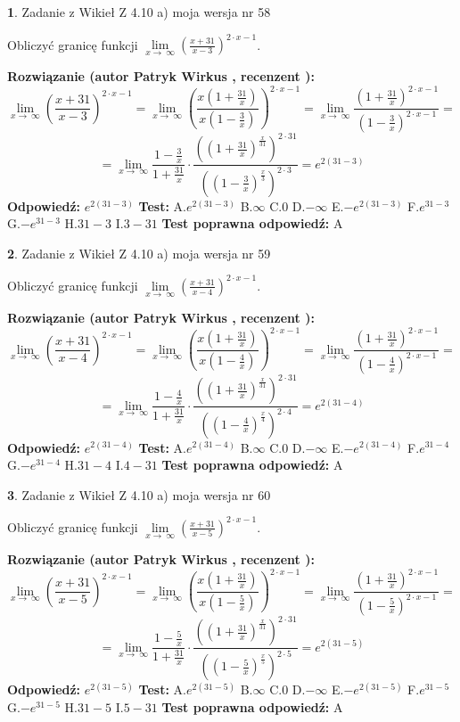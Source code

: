 \documentclass[12pt, a4paper]{article}
\theoremstyle{definition} %
\newtheorem{zad}{}
\newcommand{\zadStart}[1]{\begin{zad}#1\newline}
\newcommand{\zadStop}{\end{zad}}
\newcommand{\rozwStart}[2]{\noindent \textbf{Rozwiązanie (autor #1 , recenzent #2): }\newline}
\newcommand{\rozwStop}{\newline}
\newcommand{\odpStart}{\noindent \textbf{Odpowiedź:}\newline}
\newcommand{\odpStop}{\newline}
\newcommand{\testStart}{\noindent \textbf{Test:}\newline}
\newcommand{\testStop}{\newline}
\newcommand{\kluczStart}{\noindent \textbf{Test poprawna odpowiedź:}\newline}
\newcommand{\kluczStop}{\newline}
\begin{document}
\zadStart{Zadanie z Wikieł Z 4.10 a) moja wersja nr 58}


Obliczyć granicę funkcji  $\lim\limits_{x\to\ \infty}(\frac{x+31}{x-3})^{2\cdot x-1}$.
\zadStop
\rozwStart{Patryk Wirkus}{}
$$\lim\limits_{x\to\ \infty}(\frac{x+31}{x-3})^{2\cdot x-1} = \lim\limits_{x\to\ \infty}(\frac{x(1+\frac{31}{x})}{x(1-\frac{3}{x})})^{2\cdot x-1}=\lim\limits_{x\to\ \infty}\frac{(1+\frac{31}{x})^{2\cdot x-1}}{(1-\frac{3}{x})^{2\cdot x-1}}=$$
$$=\lim\limits_{x\to\ \infty}\frac{1-\frac{3}{x}}{1+\frac{31}{x}}\cdot\frac{((1+\frac{31}{x})^{\frac{x}{31}})^{2\cdot31}}{((1-\frac{3}{x})^{\frac{x}{3}})^{2\cdot3}}=e^{2(31-3)}$$
\rozwStop
\odpStart
$e^{2(31-3)}$
\odpStop
\testStart
A.$e^{2(31-3)}$ B.$\infty$ C.$0$ D.$-\infty$ E.$-e^{2(31-3)}$
F.$e^{31-3}$ G.$-e^{31-3}$
H.$31-3$
I.$3-31$
\testStop
\kluczStart
A
\kluczStop



\zadStart{Zadanie z Wikieł Z 4.10 a) moja wersja nr 59}


Obliczyć granicę funkcji  $\lim\limits_{x\to\ \infty}(\frac{x+31}{x-4})^{2\cdot x-1}$.
\zadStop
\rozwStart{Patryk Wirkus}{}
$$\lim\limits_{x\to\ \infty}(\frac{x+31}{x-4})^{2\cdot x-1} = \lim\limits_{x\to\ \infty}(\frac{x(1+\frac{31}{x})}{x(1-\frac{4}{x})})^{2\cdot x-1}=\lim\limits_{x\to\ \infty}\frac{(1+\frac{31}{x})^{2\cdot x-1}}{(1-\frac{4}{x})^{2\cdot x-1}}=$$
$$=\lim\limits_{x\to\ \infty}\frac{1-\frac{4}{x}}{1+\frac{31}{x}}\cdot\frac{((1+\frac{31}{x})^{\frac{x}{31}})^{2\cdot31}}{((1-\frac{4}{x})^{\frac{x}{4}})^{2\cdot4}}=e^{2(31-4)}$$
\rozwStop
\odpStart
$e^{2(31-4)}$
\odpStop
\testStart
A.$e^{2(31-4)}$ B.$\infty$ C.$0$ D.$-\infty$ E.$-e^{2(31-4)}$
F.$e^{31-4}$ G.$-e^{31-4}$
H.$31-4$
I.$4-31$
\testStop
\kluczStart
A
\kluczStop



\zadStart{Zadanie z Wikieł Z 4.10 a) moja wersja nr 60}


Obliczyć granicę funkcji  $\lim\limits_{x\to\ \infty}(\frac{x+31}{x-5})^{2\cdot x-1}$.
\zadStop
\rozwStart{Patryk Wirkus}{}
$$\lim\limits_{x\to\ \infty}(\frac{x+31}{x-5})^{2\cdot x-1} = \lim\limits_{x\to\ \infty}(\frac{x(1+\frac{31}{x})}{x(1-\frac{5}{x})})^{2\cdot x-1}=\lim\limits_{x\to\ \infty}\frac{(1+\frac{31}{x})^{2\cdot x-1}}{(1-\frac{5}{x})^{2\cdot x-1}}=$$
$$=\lim\limits_{x\to\ \infty}\frac{1-\frac{5}{x}}{1+\frac{31}{x}}\cdot\frac{((1+\frac{31}{x})^{\frac{x}{31}})^{2\cdot31}}{((1-\frac{5}{x})^{\frac{x}{5}})^{2\cdot5}}=e^{2(31-5)}$$
\rozwStop
\odpStart
$e^{2(31-5)}$
\odpStop
\testStart
A.$e^{2(31-5)}$ B.$\infty$ C.$0$ D.$-\infty$ E.$-e^{2(31-5)}$
F.$e^{31-5}$ G.$-e^{31-5}$
H.$31-5$
I.$5-31$
\testStop
\kluczStart
A
\kluczStop
\end{document}
